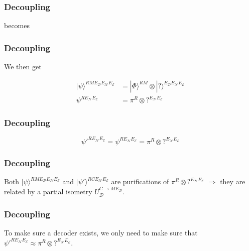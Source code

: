 \documentclass[12pt]{beamer}
\newcommand{\ket}[1]{|#1 \rangle}
\begin{document}
\begin{frame}
\frametitle{Decoupling}
    \begin{figure}
    \scalebox{0.8}{}
    \end{figure}
becomes
    \begin{figure}
    \scalebox{0.8}{}
    \end{figure}
\end{frame}

\begin{frame}
\frametitle{Decoupling}
We then get
    \begin{figure}
    \scalebox{0.7}{}
    \end{figure}
\begin{align*}
\ket{\psi}^{RM E_{\mathcal{D}} E_{\mathcal{N}} E_{\mathcal{E}}} &= \ket{\Phi}^{RM} \otimes \ket{\mbox{?}}^{E_{\mathcal{D}} E_{\mathcal{N}} E_{\mathcal{E}}}\\
\psi^{R E_{\mathcal{N}} E_{\mathcal{E}}} &= \pi^R \otimes \mbox{?}^{E_{\mathcal{N}} E_{\mathcal{E}}}
\end{align*}
\end{frame}

\begin{frame}
\frametitle{Decoupling}
    \begin{figure}
    \scalebox{0.8}{}
    \end{figure}
\[ {\psi'}^{RE_{\mathcal{N}} E_{\mathcal{E}}} = \psi^{R E_{\mathcal{N}} E_{\mathcal{E}}} = \pi^R \otimes \mbox{?}^{E_{\mathcal{N}} E_{\mathcal{E}}} \]
\end{frame}

\begin{frame}
\frametitle{Decoupling}
    \begin{figure}
    \scalebox{0.8}{}
    \end{figure}
Both $\ket{\psi}^{RME_{\mathcal{D}} E_{\mathcal{N}} E_{\mathcal{E}}}$ and $\ket{\psi'}^{RCE_{\mathcal{N}} E_{\mathcal{E}}}$ are purifications of $\pi^R \otimes \mbox{?}^{E_{\mathcal{N}} E_{\mathcal{E}}}$ $\Rightarrow$ they are related by a partial isometry $U_{\mathcal{D}}^{C \rightarrow M E_{\mathcal{D}}}$. 
\end{frame}

\begin{frame}
\frametitle{Decoupling}
    \begin{figure}
    \scalebox{0.8}{}
    \end{figure}
To make sure a decoder exists, we only need to make sure that ${\psi'}^{RE_{\mathcal{N}} E_{\mathcal{E}}} \approx \pi^R \otimes \mbox{?}^{E_{\mathcal{N}} E_{\mathcal{E}}}$.
\end{frame}
\end{document}
